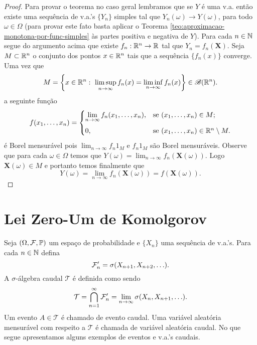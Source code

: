 \begin{proof}
Para provar o teorema no caso geral lembramos que 
se $Y$ é uma v.a. então 
existe uma sequência de v.a.'s $\{Y_n\}$ simples
tal que $Y_n(\omega)\to Y(\omega)$, 
para todo $\omega\in\Omega$
(para provar este fato basta aplicar 
o Teorema \ref{teo:aproximacao-monotona-por-func-simples}
às partes positiva e negativa de $Y$).
Para cada $n\in\mathbb{N}$ segue do argumento acima que 
existe $f_n:\mathbb{R}^n\to\mathbb{R}$ tal que $Y_n=f_n(\mathbf{X})$.
Seja $M\subset \mathbb{R}^n$ o conjunto dos pontos $x\in\mathbb{R}^n$ 
tais que a sequência $\{f_n(x)\}$ converge.
Uma vez que 
 \[
 	M
 	=
 	\left\{
 		x\in\mathbb{R}^n:\ \limsup_{n\to\infty}f_n(x)=\liminf_{n\to\infty}f_n(x)
 	\right\}\in \mathscr{B}(\mathbb{R}^n).
 \]
a seguinte função  
	\[
	f(x_1,\ldots,x_n)
	=
	\begin{cases}
	\displaystyle
	\lim_{n\to\infty} f_n(x_1,\ldots,x_n),& \text{se}\ (x_1,\ldots,x_n)\in M;
	\\[0.3cm]
	0,&\text{se}\ (x_1,\ldots,x_n)\in \R^n\setminus M.
	\end{cases}
	\]
é Borel mensurável pois $\lim_{n\to\infty} f_n1_{M}$ e $f_n1_{M}$ são 
Borel mensuráveis.
Observe que para cada $\omega\in\Omega$ temos que 
$Y(\omega)=\lim_{n\to\infty} f_n(\mathbf{X}(\omega))$.
Logo $\mathbf{X}(\omega)\in M$ e portanto temos finalmente
que 
	\[
	Y(\omega) 
	=
	\lim_{n\to\infty} f_n(\mathbf{X}(\omega))
	=
	f(\mathbf{X}(\omega)).
	\] 
\end{proof}





















\section{Lei Zero-Um de Komolgorov}

Seja $(\Omega,\mathcal{F},\mathbb{P})$ um espaço de probabilidade e 
$\{X_n\}$ uma sequência de v.a.'s. 
Para cada $n\in\mathbb{N}$ defina
	\[
		\mathcal{F}_n' = \sigma( X_{n+1},X_{n+2},\ldots).
	\] 
A $\sigma$-álgebra caudal $\mathcal{T}$
é definida como sendo 
	\[
		\mathcal{T}
		=
		\bigcap_{n=1}^{\infty}
		\mathcal{F}_n'
		=
		\lim_{n\to\infty} \sigma(X_n,X_{n+1},\ldots).
	\]
Um evento $A\in\mathcal{T}$ é chamado de evento caudal.
Uma variável aleatória mensurável com respeito a $\mathcal{T}$
é chamada de variável aleatória caudal. 
No que segue apresentamos
alguns exemplos de eventos e v.a.'s caudais.

